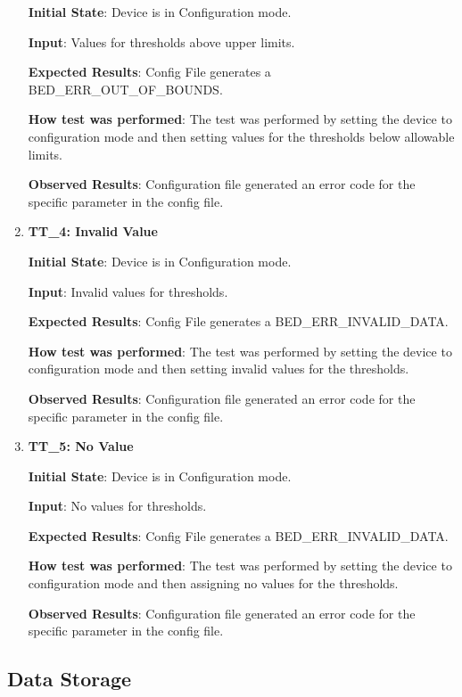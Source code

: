 \documentclass[12pt, titlepage]{article}
\begin{document}
\begin{enumerate}
  \textbf{Initial State}: Device is in Configuration mode.

  \textbf{Input}: Values for thresholds above upper limits.

  \textbf{Expected Results}: Config File generates a BED\_ERR\_OUT\_OF\_BOUNDS.

  \textbf{How test was performed}: The test was performed by setting the device to configuration mode and then setting values for the thresholds below allowable limits.

  \textbf{Observed Results}: Configuration file generated an error code for the specific parameter in the config file.

  \item{\textbf{TT\_4: Invalid Value} \\}\label{TT4}

  \textbf{Initial State}: Device is in Configuration mode.

  \textbf{Input}: Invalid values for thresholds.

  \textbf{Expected Results}: Config File generates a BED\_ERR\_INVALID\_DATA.

  \textbf{How test was performed}: The test was performed by setting the device to configuration mode and then setting invalid values for the thresholds.

  \textbf{Observed Results}: Configuration file generated an error code for the specific parameter in the config file.

  \item{\textbf{TT\_5: No Value} \\}\label{TT5}

  \textbf{Initial State}: Device is in Configuration mode.

  \textbf{Input}: No values for thresholds.

  \textbf{Expected Results}: Config File generates a BED\_ERR\_INVALID\_DATA.

  \textbf{How test was performed}: The test was performed by setting the device to configuration mode and then assigning no values for the thresholds.

  \textbf{Observed Results}: Configuration file generated an error code for the specific parameter in the config file.
\end{enumerate}

\subsection{Data Storage}
\end{document}
